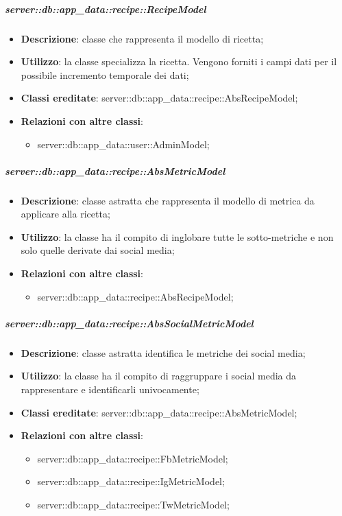 		\subparagraph{server::db::app\_data::recipe::RecipeModel} %
		\label{subp:server_db_app_data_recipe_recipemodel}
			\begin{itemize}
				\item \textbf{Descrizione}: classe che rappresenta il modello di ricetta;
				\item \textbf{Utilizzo}: la classe specializza la ricetta. Vengono forniti i campi dati per il possibile incremento temporale dei dati;
				\item \textbf{Classi ereditate}: server::db::app\_data::recipe::AbsRecipeModel;
				\item \textbf{Relazioni con altre classi}:
					\begin{itemize}
						\item server::db::app\_data::user::AdminModel;
					\end{itemize}
			\end{itemize}


		\subparagraph{server::db::app\_data::recipe::AbsMetricModel} %
		\label{subp:server_db_app_data_recipe_absmetricmodel}
			\begin{itemize}
				\item \textbf{Descrizione}: classe astratta che rappresenta il modello di metrica da applicare alla ricetta;
				\item \textbf{Utilizzo}: la classe ha il compito di inglobare tutte le sotto-metriche e non solo quelle derivate dai social media;
				\item \textbf{Relazioni con altre classi}:
					\begin{itemize}
						\item server::db::app\_data::recipe::AbsRecipeModel;
					\end{itemize}
			\end{itemize}


		\subparagraph{server::db::app\_data::recipe::AbsSocialMetricModel} %
		\label{subp:server_db_app_data_recipe_abssocialmetricmodel}
			\begin{itemize}
				\item \textbf{Descrizione}: classe astratta identifica le metriche dei social media;
				\item \textbf{Utilizzo}: la classe ha il compito di raggruppare i social media da rappresentare e identificarli univocamente;
				\item \textbf{Classi ereditate}: server::db::app\_data::recipe::AbsMetricModel;
				\item \textbf{Relazioni con altre classi}:
					\begin{itemize}
						\item server::db::app\_data::recipe::FbMetricModel;
						\item server::db::app\_data::recipe::IgMetricModel;
						\item server::db::app\_data::recipe::TwMetricModel;
					\end{itemize}
			\end{itemize}


